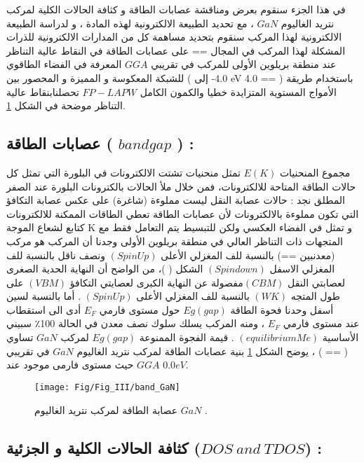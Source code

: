 في هذا الجزء سنقوم بعرض ومناقشة عصابات الطاقة و كثافة الحالات الكلية لمركب نتريد الغاليوم $ GaN $ ، مع تحديد الطبيعة الالكترونية لهذه المادة ، و لدراسة الطبيعة الالكترونية لهذا المركب سنقوم بتحديد مساهمة كل من المدارات الالكترونية للذرات المشكلة لهذا المركب في المجال == على عصابات الطاقة في النقاط عالية التناظر عند منطقة بريلوين الأولى للمركب في تقريبي $ GGA $ المعرفة في الفضاء الطاقوي للشبكة المعكوسة و المميزة و المحصور بين ( 4.0- إلى eV 4.0 == ) 
باستخدام طريقة الأمواج المستوية المتزايدة خطيا والكمون الكامل $ FP-LAPW $ تحصلنابنقاط عالية التناظر موضحة في الشكل \ref{fig:bandgan}.

\subsection*{ عصابات الطاقة ( $ bandgap $ ) : }

مجموع المنحنيات  $ E(K) $ تمثل منحنيات تشتت الالكترونات في البلورة التي تمثل كل حالات الطاقة المتاحة للالكترونات، فمن خلال ملأ الحالات بالكترونات البلورة عند الصفر المطلق نجد : حالات عصابة النقل ليست مملوءة (شاغرة) على عكس عصابة التكافؤ التي تكون مملوءة بالالكترونات لأن عصابات الطاقة تعطي الطاقات الممكنة للالكترونات كتابع لشعاع الموجة K و تمثل في الفضاء العكسي ولكن للتبسيط يتم التعامل فقط مع المتجهات ذات التناظر العالي في منطقة بريلوين الأولى وجدنا أن المركب هو مركب (معدنبين ==) بالنسبة للف المغزلي الأعلى $ ( Spin Up ) $ ونصف ناقل بالنسبة للف المغزلي الاسفل $ ( Spin down ) $ الشكل (  )، من الواضح أن النهاية الحدية الصغرى لعصابتي النقل $ ( CBM)  $مفصولة عن النهاية الكبرى لعصايتي التكافؤ $ ( VBM ) $ على طول المتجه $ (WK) $ بالنسبة للف المغزلي الأعلى $ ( Spin Up ) $ . أما بالنسبة لسين أسفل وحدنا فحوة الطاقة $ Eg ( gap ) $ حول مستوى فارمي $ E_{F} $ أدى الى استقطاب سبيني ‫‪٪‬‬100 عند مستوى فارمي $ E_{F} $ ، ومنه المركب يسلك سلوك نصف معدن في الحالة الأساسية $ (equilibrium Me ) $ . قيمة الفجوة الممنوعة $ Eg ( gap ) $ لمركب $ GaN $ تساوي  ( == ) ، يوضح الشكل \ref{fig:bandgan} بنية عصابات الطاقة لمركب  نتريد الغاليوم $ GaN  $ في تقريبي $ GGA $  حيث مستوى فارمی موجود عند $0.0 eV $.

\begin{figure}[h!]
	\centering
	\texttt{[image: Fig/Fig\_III/band\_GaN]}
	\caption{ عصابة الطاقة لمركب نتريد الغاليوم $ GaN  $ . }
	\label{fig:bandgan}
\end{figure}
\FloatBarrier

\subsection*{كثافة الحالات الكلية و الجزئية ($  DOS~and~TDOS $) : }

